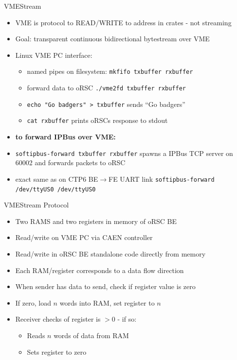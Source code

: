 \documentclass{beamer}
\begin{document}
\begin{frame}{VMEStream}
\begin{itemize}
\item VME is protocol to READ/WRITE to address in crates - not streaming
\item Goal: transparent continuous bidirectional bytestream over VME
\item Linux VME PC interface:
\begin{itemize}
\item named pipes on filesystem: {\tt mkfifo txbuffer rxbuffer}
\item forward data to oRSC {\tt ./vme2fd txbuffer rxbuffer}
\item {\tt echo "Go badgers" > txbuffer} sends ``Go badgers'' 
\item {\tt cat rxbuffer} prints oRSCs response to stdout
\end{itemize}
\item[] {\bf to forward IPBus over VME:}
\item {\tt softipbus-forward txbuffer rxbuffer} spawns a IPBus TCP server on 60002 and forwards packets to oRSC
\item exact same as on CTP6 BE$\to$FE UART link
{\tt softipbus-forward /dev/ttyUS0 /dev/ttyUS0}
\end{itemize}
\end{frame}

\begin{frame}{VMEStream Protocol}
\begin{itemize}
\item Two RAMS and two registers in memory of oRSC BE
\item Read/write on VME PC via CAEN controller
\item Read/write in oRSC BE standalone code directly from memory
\item Each RAM/register corresponds to a data flow direction
\item When sender has data to send, check if register value is zero
\item If zero, load $n$ words into RAM, set register to $n$
\item Receiver checks of register is $> 0$ - if so:
\begin{itemize}
\item Reads $n$ words of data from RAM
\item Sets register to zero
\end{itemize}
\end{itemize}
\end{frame}
\end{document}
